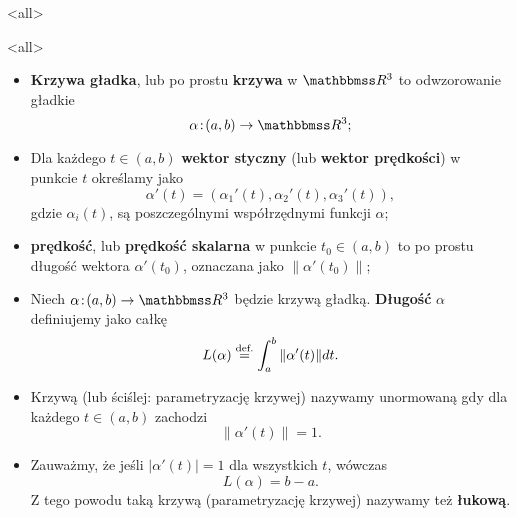 \mode*
\mode<all>{}

\begin{frame}[<+->]
\begin{center}
\begin{tikzpicture}[y=0.80pt, x=0.8pt,scale=0.7,yscale=-1, inner sep=0pt, outer sep=0pt]

\end{tikzpicture}
\end{center}
\end{frame}
\mode<all>{}
\begin{frame}[<+->]
\begin{definicja}
\begin{itemize}
\item\textbf{Krzywa gładka}, lub po prostu \textbf{krzywa} w $\R^3$ to odwzorowanie gładkie \[\alpha\colon (a,b)\to \R^3;\]
\item Dla każdego $t\in (a,b)$ \textbf{wektor styczny} (lub \textbf{wektor prędkości}) w punkcie $t$ określamy jako \[\alpha'(t)=(\alpha_1'(t),\alpha_2'(t),\alpha_3'(t)),\]gdzie $\alpha_i(t)$, są poszczególnymi współrzędnymi funkcji $\alpha$;
\item \textbf{prędkość}, lub \textbf{prędkość skalarna} w punkcie $t_0\in (a,b)$ to po prostu długość wektora $\alpha'(t_0)$, oznaczana jako $\|\alpha'(t_0)\|$;
\end{itemize}
\end{definicja}
\end{frame}
\begin{frame}[<+->]

\begin{definicja}
\begin{itemize}
\item Niech $\alpha\colon (a,b)\to \R^3$ będzie krzywą gładką. \textbf{Długość} $\alpha$ definiujemy jako całkę
\[L(\alpha)\define\int_a^b\|\alpha'(t)\|dt.\]
\item Krzywą (lub ściślej: parametryzację krzywej) nazywamy unormowaną gdy dla każdego $t\in (a,b)$ zachodzi \[\|\alpha'(t)\|=1.\]
\item Zauważmy, że jeśli $|\alpha'(t)|=1$ dla wszystkich $t$, w\'owczas 
\[L(\alpha)=b-a.\]Z tego powodu taką krzywą (parametryzację krzywej) nazywamy też \textbf{łukową}.
\end{itemize}

\end{definicja}
\end{frame}

